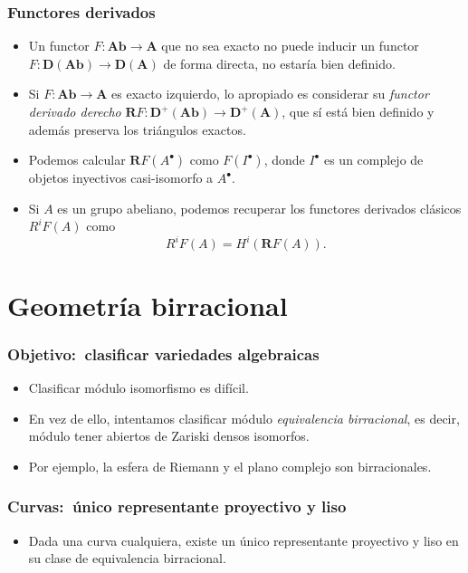 \documentclass[12pt]{beamer}
\begin{document}
\begin{frame}
  \frametitle{Functores derivados}
  \begin{itemize}
    \item Un functor $F \colon \mathbf{Ab} \to \mathbf{A}$ que no sea exacto no puede inducir un functor $F \colon \mathbf{D}(\mathbf{Ab}) \to \mathbf{D}(\mathbf{A})$ de forma directa, no estaría bien definido.
      \pause
    \item Si $F \colon \mathbf{Ab} \to \mathbf{A}$ es exacto izquierdo, lo apropiado es considerar su \textit{functor derivado derecho} $\mathbf{R}F \colon \mathbf{D}^{+}(\mathbf{Ab}) \to \mathbf{D}^{+}(\mathbf{A})$, que sí está bien definido y además preserva los triángulos exactos.
      \pause
    \item Podemos calcular $\mathbf{R}F(A^{\bullet})$ como $F(I^{\bullet})$, donde $I^{\bullet}$ es un complejo de objetos inyectivos casi-isomorfo a $A^{\bullet}$.
      \pause
    \item Si $A$ es un grupo abeliano, podemos recuperar los functores derivados clásicos $R^{i}F(A)$ como
      \[ R^{i}F(A) = H^{i}(\mathbf{R}F(A)). \]
  \end{itemize}
\end{frame}

\section{Geometría birracional}

\begin{frame}
  \frametitle{Objetivo:~clasificar variedades algebraicas}
  \begin{itemize}
    \item Clasificar módulo isomorfismo es difícil.
      \pause
    \item En vez de ello, intentamos clasificar módulo \textit{equivalencia birracional}, es decir, módulo tener abiertos de Zariski densos isomorfos.
      \pause
    \item Por ejemplo, la esfera de Riemann y el plano complejo son birracionales.
  \end{itemize}
\end{frame}

\begin{frame}
  \frametitle{Curvas:~único representante proyectivo y liso}
  \begin{itemize}
    \item Dada una curva cualquiera, existe un único representante proyectivo y liso en su clase de equivalencia birracional.
  \end{itemize}
\end{frame}
\end{document}
